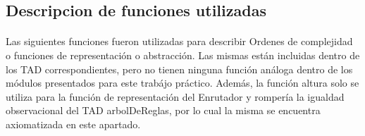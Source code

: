 \subsection*{Descripcion de funciones utilizadas}
\paragraph{}
Las siguientes funciones fueron utilizadas para describir Ordenes de complejidad o funciones de representaci\'on o abstracci\'on. Las mismas est\'an incluidas dentro de los TAD correspondientes, pero no tienen ninguna funci\'on an\'aloga dentro de los m\'odulos presentados para este trab\'ajo pr\'actico. Adem\'as, la funci\'on altura solo se utiliza para la funci\'on de representaci\'on del Enrutador y romper\'ia la igualdad observacional del TAD arbolDeReglas, por lo cual la misma se encuentra axiomatizada en este apartado.



